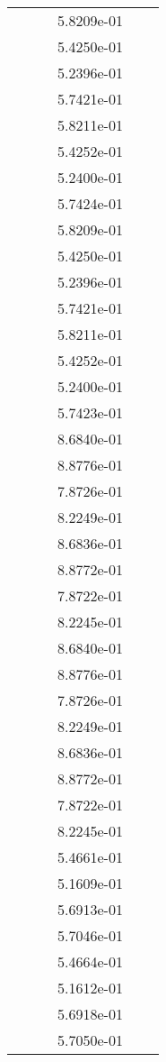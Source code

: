 \begin{xltabular}{\textwidth}{r|rS[table-format=1.3e+2]S[table-format=1.4e+2]S[table-format=1.4e+2]S[table-format=-1.5]}
&  &  & 5.8209e-01 & & \\
&  &  & 5.4250e-01 & & \\
&  &  & 5.2396e-01 & & \\
&  &  & 5.7421e-01 & & \\
&  &  & 5.8211e-01 & & \\
&  &  & 5.4252e-01 & & \\
&  &  & 5.2400e-01 & & \\
&  &  & 5.7424e-01 & & \\
&  &  & 5.8209e-01 & & \\
&  &  & 5.4250e-01 & & \\
&  &  & 5.2396e-01 & & \\
&  &  & 5.7421e-01 & & \\
&  &  & 5.8211e-01 & & \\
&  &  & 5.4252e-01 & & \\
&  &  & 5.2400e-01 & & \\
&  &  & 5.7423e-01 & & \\
&  &  & 8.6840e-01 & & \\
&  &  & 8.8776e-01 & & \\
&  &  & 7.8726e-01 & & \\
&  &  & 8.2249e-01 & & \\
&  &  & 8.6836e-01 & & \\
&  &  & 8.8772e-01 & & \\
&  &  & 7.8722e-01 & & \\
&  &  & 8.2245e-01 & & \\
&  &  & 8.6840e-01 & & \\
&  &  & 8.8776e-01 & & \\
&  &  & 7.8726e-01 & & \\
&  &  & 8.2249e-01 & & \\
&  &  & 8.6836e-01 & & \\
&  &  & 8.8772e-01 & & \\
&  &  & 7.8722e-01 & & \\
&  &  & 8.2245e-01 & & \\
&  &  & 5.4661e-01 & & \\
&  &  & 5.1609e-01 & & \\
&  &  & 5.6913e-01 & & \\
&  &  & 5.7046e-01 & & \\
&  &  & 5.4664e-01 & & \\
&  &  & 5.1612e-01 & & \\
&  &  & 5.6918e-01 & & \\
&  &  & 5.7050e-01 & & \\

\end{xltabular}
